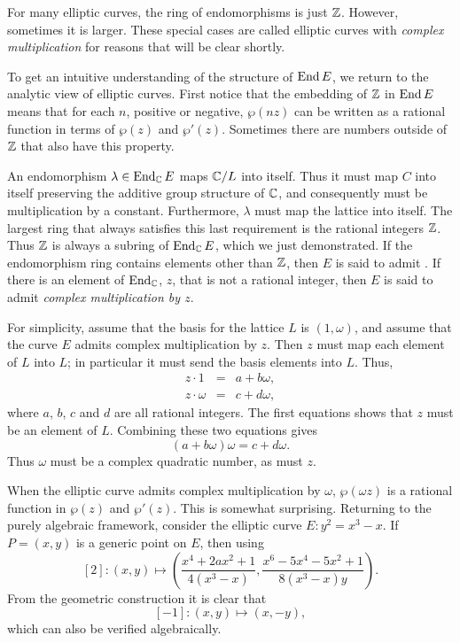 \medskip
For many elliptic curves, the ring of endomorphisms is just $\mathbb{Z}$.
However, sometimes it is larger.  These special cases are called
elliptic curves with {\em complex multiplication} for reasons that
will be clear shortly. 

To get an intuitive understanding of the structure of $\mathop{\rm End}\nolimits E$, we
return to the analytic view of elliptic curves.  First notice that the
embedding of $\mathbb{Z}$ in $\mathop{\rm End}\nolimits E$ means that for each $n$, positive or
negative, $\wp(nz)$ can be written as a rational function in terms of
$\wp(z)$ and $\wp'(z)$.  Sometimes there are numbers outside of $\mathbb{Z}$
that also have this property.

An endomorphism $\lambda \in \mathop{\rm End}\nolimits_{\mathbb{C}} E$ maps $\mathbb{C}/L$ into itself.
Thus it must map $C$ into itself preserving the additive group
structure of $\mathbb{C}$, and consequently must be multiplication by a
constant.  Furthermore, $\lambda$ must map the lattice into itself.
The largest ring that always satisfies this last requirement is the
rational integers $\mathbb{Z}$.  Thus $\mathbb{Z}$ is always a subring of $\mathop{\rm End}\nolimits_{\mathbb{C}}
E$, which we just demonstrated.  If the endomorphism ring contains
elements other than $\mathbb{Z}$, then $E$ is said to admit .  If there is an element of $\mathop{\rm End}\nolimits_{\mathbb{C}}$, $z$, that is
not a rational integer, then $E$ is said to admit {\em complex
multiplication by $z$\/}. 

For simplicity, assume that the basis for the lattice $L$ is 
$(1, \omega)$, and assume that the curve $E$ admits complex multiplication
by $z$.  Then $z$ must map each element of $L$ into $L$; in particular
it must send the basis elements into $L$.  Thus,
\begin{eqnarray*}
z\cdot 1 &=& a + b \omega,\\
z \cdot \omega &=& c + d \omega,
\end{eqnarray*}
where $a$, $b$, $c$ and $d$ are all rational integers.
The first equations shows that $z$ must be an element of $L$.
Combining these two equations gives
\[
(a + b \omega) \omega = c + d \omega.
\]
Thus $\omega$ must be a complex quadratic number, as must $z$.  

When the elliptic curve admits complex multiplication by $\omega$,
$\wp(\omega z)$ is a rational function in $\wp(z)$ and $\wp'(z)$.
This is somewhat surprising.  Returning to the purely algebraic
framework, consider the elliptic curve $E : y^2 = x^3 - x$.
If $P = (x, y)$ is a generic point on $E$, then using 
\[
[2] : (x, y) \mapsto
\left( \frac{x^4+2ax^2+1}{4(x^3-x)}, 
   \frac{x^6-5x^4-5x^2+1}{8(x^3-x)y}\right).
\]
From the geometric construction it is clear that
\[
[-1] : (x, y) \mapsto (x, -y),
\]
which can also be verified algebraically. 

